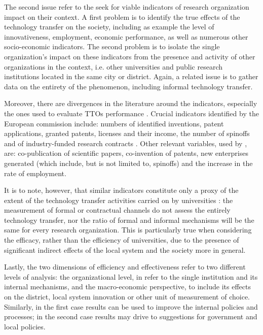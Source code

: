 The second issue refer to the seek for viable indicators of research organization impact on their context. A first problem is to identify the true effects of the technology transfer on the society, including as example the level of innovativeness, employment, economic performance, as well as numerous other socio-economic indicators. The second problem is to isolate the single organization's impact on these indicators from the presence and activity of other organizations in the context, i.e. other universities and public research institutions located in the same city or district. Again, a related issue is to gather data on the entirety of the phenomenon, including informal technology transfer. 

Moreover, there are divergences in the literature around the indicators, especially the ones used to evaluate TTOs performance \citet{Muscio2010}. Crucial indicators identified by the European commission include: numbers of identified inventions, patent applications, granted patents, licenses and their income, the number of spinoffs and of industry-funded research contracts \citep{Balderi2010}. Other relevant variables, used by \citet{Guerrero2014}, are: co-publication of scientific papers, co-invention of patents, new enterprises generated (which include, but is not limited to, spinoffs) and the increase in the rate of employment. 

It is to note, however, that similar indicators constitute only a proxy of the extent of the technology transfer activities carried on by universities \citep{Leydesdorff2010}: the measurement of formal or contractual channels do not assess the entirely technology transfer, nor the ratio of formal and informal mechanisms will be the same for every research organization. This is particularly true when considering the efficacy, rather than the efficiency of universities, due to the presence of significant indirect effects of the local system and the society more in general.

Lastly, the two dimensions of efficiency and effectiveness refer to two different levels of analysis: the organizational level, in refer to the single institution and its internal mechanisms, and the macro-economic perspective, to include its effects on the district, local system innovation or other unit of measurement of choice. Similarly, in the first case results can be used to improve the internal policies and processes; in the second case results may drive to suggestions for government and local policies.

